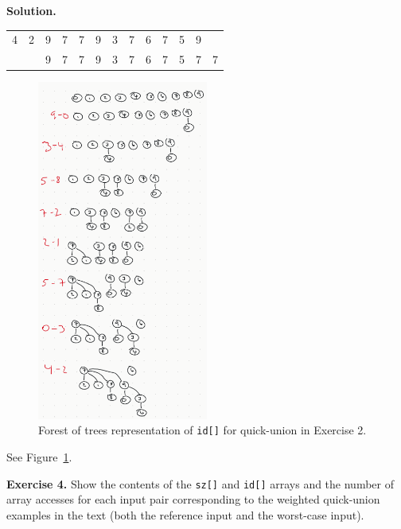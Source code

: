 \documentclass[12pt, a4paper]{article}
\newenvironment{ex}[2][Exercise]
{\par\medskip\noindent \textbf{#1 #2.}}
{\medskip}
\newenvironment{sol}[1][Solution]
{\par\medskip\noindent \textbf{#1.} }
{\medskip}
\begin{document}
\begin{sol}
\begin{center}
\begin{tabular}{cc|cccccccccc|c}
				4  & 2  & {\color{green}9} & {\color{green}7} & {\color{green}7} & {\color{green}9} & {\color{green}3} & {\color{green}7} & 6 & {\color{green}7} & {\color{green}5} & {\color{green}9} & {}\\
				{} & {} & 9 & 7 & 7 & 9 & 3 & 7 & 6 & 7 & 5 & {\color{red}7} & 7\\
			\end{tabular}
		\end{center}
		\begin{figure}
			\centering
			\includegraphics[width=0.5\textwidth]{exercise-03-weighted-quick-union-forest-of-trees}
			\caption{Forest of trees representation of \texttt{id[]} for quick-union in Exercise 2.}
			\label{ex-03}
		\end{figure}
		See Figure~\ref{ex-03}.
	\end{sol}
	\begin{ex}{4}
		Show the contents of the \texttt{sz[]} and \texttt{id[]} arrays and the number of array
		accesses for each input pair corresponding to the weighted quick-union examples in the
		text (both the reference input and the worst-case input).
	\end{ex}
\end{document}
